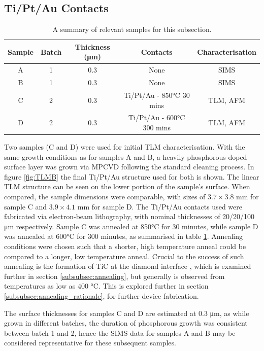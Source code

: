 \begin{refsection}
\subsection{Ti/Pt/Au Contacts}
\begin{table}[h]
\centering
\caption{A summary of relevant samples for this subsection.}
\label{table:short_samples_summary}
\begin{tabular}{|c|c|c|c|c|}
\hline
Sample & Batch & Thickness (\si{\micro\metre}) & Contacts & Characterisation \\
\hline
A & 1 & 0.3 & None & SIMS \\
B & 1 & 0.3 & None & SIMS \\
C & 2 & 0.3 & Ti/Pt/Au - 850\si{\degreeCelsius} 30 mins  & TLM, AFM \\
D & 2 & 0.3 & Ti/Pt/Au - 600\si{\degreeCelsius} 300 mins & TLM, AFM \\
\hline
\end{tabular}
\end{table}
Two samples (C and D) were used for initial TLM characterisation. With the same growth conditions as for samples A and B, a heavily phosphorous doped surface layer was grown via MPCVD following the standard cleaning process. In figure \ref{fig:TLMB} the final Ti/Pt/Au structure used for both is shown. The linear TLM structure can be seen on the lower portion of the sample's surface. When compared, the sample dimensions were comparable, with sizes of $3.7\times3.8$ \si{\milli\metre} for sample C and $3.9\times4.1$ \si{\milli\metre} for sample D. The Ti/Pt/Au contacts used were fabricated via electron-beam lithography, with nominal thicknesses of 20/20/100 \si{\micro\metre} respectively. Sample C was annealed at 850\si{\degreeCelsius} for 30 minutes, while sample D was annealed at 600\si{\degreeCelsius} for 300 minutes, as summarised in table \ref{table:short_samples_summary}. Annealing conditions were chosen such that a shorter, high temperature anneal could be compared to a longer, low temperature anneal. Crucial to the success of such annealing is the formation of TiC at the diamond interface \cite{teraji2000, teraji2003}, which is examined further in section \ref{subsubsec:annealing}, but generally is observed from temperatures as low as $400$ \si{\degreeCelsius}. This is explored further in section \ref{subsubsec:annealing_rationale}, for further device fabrication.

The surface thicknesses for samples C and D are estimated at 0.3 \si{\micro\metre}, as while grown in different batches, the duration of phosphorous growth was consistent between batch 1 and 2, hence the SIMS data for samples A and B may be considered representative for these subsequent samples.


\end{refsection}
